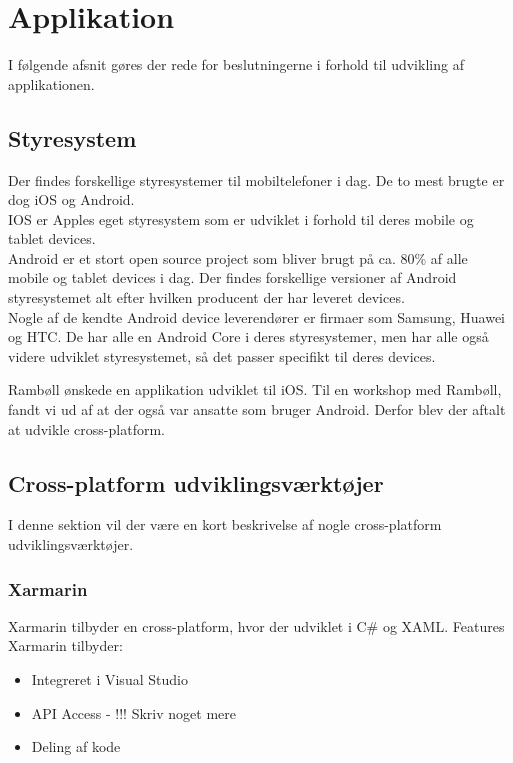 \section{Applikation}                                   
I følgende afsnit gøres der rede for beslutningerne i forhold til udvikling af applikationen.

\subsection{Styresystem}
Der findes forskellige styresystemer til mobiltelefoner i dag. De to mest brugte er dog iOS \cite{iOS} og Android. \cite{Android} \\
IOS er Apples eget styresystem som er udviklet i forhold til deres mobile og tablet devices. \\
Android er et stort open source project som bliver brugt på ca. 80\% af alle mobile og tablet devices i dag. Der findes forskellige versioner af Android styresystemet alt efter hvilken producent der har leveret devices. \\
Nogle af de kendte Android device leverendører er firmaer som Samsung, Huawei og HTC. De har alle en Android Core i deres styresystemer, men har alle også videre udviklet styresystemet, så det passer specifikt til deres devices.

Rambøll ønskede en applikation udviklet til iOS. Til en workshop med Rambøll, fandt vi ud af at der også var ansatte som bruger Android. Derfor blev der aftalt at udvikle cross-platform. \\

\subsection{Cross-platform udviklingsværktøjer}
I denne sektion vil der være en kort beskrivelse af nogle cross-platform udviklingsværktøjer.

\subsubsection{Xarmarin}
Xarmarin tilbyder en cross-platform, hvor der udviklet i C\#\cite{CSharp} og XAML\cite{XAML}.
Features Xarmarin tilbyder:
\begin{itemize}[-]
	\item Integreret i Visual Studio
	\item API Access - !!! Skriv noget mere
	\item Deling af kode
\end{itemize}

